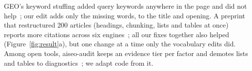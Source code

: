 GEO's keyword stuffing added query keywords anywhere in the page and did not help~\cite{aggarwal2024geo}; our edit adds only the missing words, to the title and opening.
A preprint that restructured 200 articles (headings, chunking, lists and tables at once) reports more citations across six engines~\cite{yu2026geosfe}; all our fixes together also helped (Figure~\ref{fig:result}a), but one change at a time only the vocabulary edits did.
Among open tools, aiseo-audit keeps an evidence tier per factor and demotes lists and tables to diagnostics~\cite{aiseoaudit}; we adapt code from it.
